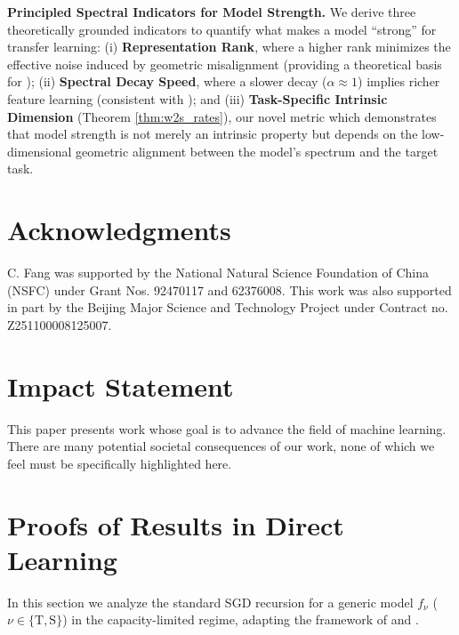 \documentclass{article}
\theoremstyle{definition}
\theoremstyle{definition}
\theoremstyle{plain}
\theoremstyle{plain}
\theoremstyle{plain}
\theoremstyle{plain}
\theoremstyle{plain}
\newcommand{\te}{\mathrm{T}}
\newcommand{\st}{\mathrm{S}}
\begin{document}
\textbf{Principled Spectral Indicators for Model Strength.}
We derive three theoretically grounded indicators to quantify what makes a model ``strong'' for transfer learning:
(i) \textbf{Representation Rank}, where a higher rank minimizes the effective noise induced by geometric misalignment (providing a theoretical basis for \citet{garrido2023rankmeassessingdownstreamperformance});
(ii) \textbf{Spectral Decay Speed}, where a slower decay ($\alpha \approx 1$) implies richer feature learning (consistent with \citet{Agrawal2022alphaReQA}); and
(iii) \textbf{Task-Specific Intrinsic Dimension} (Theorem \ref{thm:w2s_rates}), our novel metric which demonstrates that model strength is not merely an intrinsic property but depends on the low-dimensional geometric alignment between the model's spectrum and the target task.

\section*{Acknowledgments}

C. Fang was supported by the National Natural Science Foundation of China (NSFC) under Grant Nos. 92470117 and 62376008. This work was also supported in part by the Beijing Major Science and Technology Project under Contract no. Z251100008125007.




\newpage
\section*{Impact Statement}

This paper presents work whose goal is to advance the field of machine learning. There are many potential societal consequences of our work, none of which we feel must be specifically highlighted here.







\newpage




\newpage
\appendix
\onecolumn


\section{Proofs of Results in Direct Learning}
\label{app:proofs_direct_learning}
In this section we analyze the standard SGD recursion for a generic model $f_\nu$ ($\nu \in \{\te, \st\}$) in the capacity-limited regime, adapting the framework of \citet{ge2019step} and \citet{wu2022last}.
\end{document}
